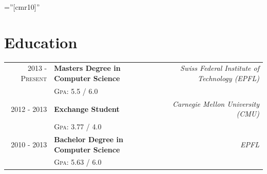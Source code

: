 \documentclass[a4paper,11pt]{article} %
\begin{document}
\pagestyle{empty} %

\font\fb=''[cmr10]'' %



\par{
\bigskip
\par
} %


\section{Education}

\begin{tabularx}{\textwidth}{r X r} 	
2013 - \textsc{Present} & 
\textbf{Masters Degree in Computer Science} & 
\textit{Swiss Federal Institute of Technology (EPFL)}\\
&\footnotesize \textsc{Gpa}: 5.5 / 6.0\\


2012 - 2013 & 
\textbf{Exchange Student} &
\textit{Carnegie Mellon University (CMU)}\\
&\footnotesize \textsc{Gpa}: 3.77 / 4.0\\


2010 - 2013 & 
\textbf{Bachelor Degree in Computer Science} & 
\textit{ EPFL }\\
&\footnotesize \textsc{Gpa}: 5.63 / 6.0\\


\end{tabularx}
\end{document}
